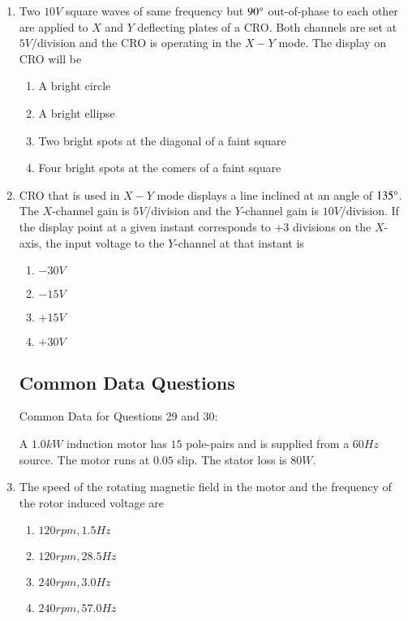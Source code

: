 \documentclass[journal]{IEEEtran}
\begin{document}
\begin{enumerate}
    \item Two $10V$ square waves of same frequency but $90\degree$ out-of-phase to each other are applied to $X$ and $Y$ deflecting plates of a CRO. Both channels are set at $5V$/division and the CRO is operating in the $X-Y$ mode. The display on CRO will be 
        \begin{enumerate}
            \item A bright circle
            \item A bright ellipse
            \item Two bright spots at the diagonal of a faint square
            \item Four bright spots at the comers of a faint square
        \end{enumerate}

    \item CRO that is used in $X-Y$ mode displays a line inclined at an angle of $135\degree$. The $X$-channel gain is $5V$/division and the $Y$-channel gain is $10V$/division. If the display point at a given instant corresponds to $+3$ divisions on the $X$-axis, the input voltage to the $Y$-channel at that instant is 
        \begin{enumerate}
            \item $-30V$
            \item $-15V$
            \item $+15V$
            \item $+30V$
        \end{enumerate}

\subsection*{Common Data Questions}

Common Data for Questions 29 and 30:

A $1.0kW$ induction motor has $15$ pole-pairs and is supplied from a $60Hz$ source. The motor runs at $0.05$ slip. The stator loss is $80W$.
    
    \item The speed of the rotating magnetic field in the motor and the frequency of the rotor induced voltage are
        \begin{enumerate}
            \item $120rpm, 1.5Hz$
            \item $120rpm, 28.5Hz$
            \item $240rpm, 3.0Hz$
            \item $240rpm, 57.0Hz$
        \end{enumerate}


\end{enumerate}
\end{document}
